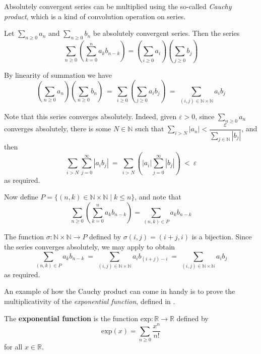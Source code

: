 Absolutely convergent series can be multiplied using the so-called \textit{Cauchy product}, which is a kind of convolution operation on series.

\begin{theorem}
\label{thmCauchyProduct}
Let $\displaystyle \sum_{n \ge 0} a_n$ and $\displaystyle \sum_{n \ge 0} b_n$ be absolutely convergent series. Then the series
\[ \sum_{n \ge 0} \left( \sum_{k=0}^n a_k b_{n-k} \right) = \left( \sum_{i \ge 0} a_i \right) \left( \displaystyle \sum_{j \ge 0} b_j \right) \]
\end{theorem}

\begin{cproof}
By linearity of summation we have
\[ \left( \sum_{n \ge 0} a_n \right) \left( \sum_{n \ge 0} b_n \right) ~=~ \sum_{i \ge 0} \left(\sum_{j \ge 0} a_i b_j \right) ~=~ \sum_{(i,j) \in \mathbb{N} \times \mathbb{N}} a_i b_j \]

Note that this series converges absolutely. Indeed, given $\varepsilon > 0$, since $\sum_{n \ge 0} a_n$ converges absolutely, there is some $N \in \mathbb{N}$ such that $\sum_{i > N} |a_n| < \dfrac{\varepsilon}{\sum_{j \in \mathbb{N}} |b_j|}$, and then
\[ \sum_{i > N} \sum_{j=0}^{\infty} |a_i b_j| ~=~ \sum_{i>N} \left( |a_i| \sum_{j=0}^{\infty} |b_j| \right) ~<~ \varepsilon \]
as required.

Now define $P = \{ (n,k) \in \mathbb{N} \times \mathbb{N} \mid k \le n \}$, and note that
\[ \sum_{n \ge 0} \left( \sum_{k=0}^n a_k b_{n-k} \right) = \sum_{(n,k) \in P} a_k b_{n-k} \]

The function $\sigma : \mathbb{N} \times \mathbb{N} \to P$ defined by $\sigma(i,j) = (i+j, i)$ is a bijection. Since the series converges absolutely, we may apply  to obtain
\[ \sum_{(n,k) \in P} a_k b_{n-k} ~=~ \sum_{(i,j) \in \mathbb{N} \times \mathbb{N}} a_i b_{(i+j) - i} ~=~ \sum_{(i,j) \in \mathbb{N} \times \mathbb{N}} a_i b_j \]
as required.
\end{cproof}

An example of how the Cauchy product can come in handy is to prove the multiplicativity of the \textit{exponential function}, defined in .

\begin{definition}
\label{defExponentialFunction}
The \textbf{exponential function} is the function $\mathrm{exp} : \mathbb{R} \to \mathbb{R}$ defined by
\[ \mathrm{exp}(x) = \sum_{n \ge 0} \frac{x^n}{n!} \]
for all $x \in \mathbb{R}$.
\end{definition}

